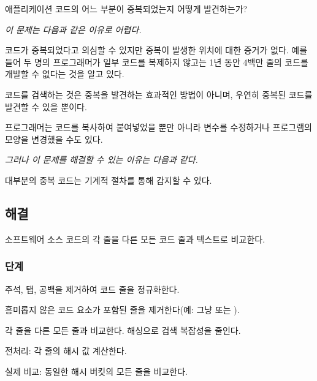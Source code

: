 \documentclass[a4paper,10pt,twoside]{book}
\begin{document}
애플리케이션 코드의 어느 부분이 중복되었는지 어떻게 발견하는가?

\emph{이 문제는 다음과 같은 이유로 어렵다.} 

\begin{bulletlist}
\item 코드가 중복되었다고 의심할 수 있지만 중복이 발생한 위치에 대한 증거가 없다. 예를 들어 두 명의 프로그래머가 일부 코드를 복제하지 않고는 1년 동안 4백만 줄의 코드를 개발할 수 없다는 것을 알고 있다.

\item 코드를 검색하는 것은 중복을 발견하는 효과적인 방법이 아니며, 우연히 중복된 코드를 발견할 수 있을 뿐이다.

\item 프로그래머는 코드를 복사하여 붙여넣었을 뿐만 아니라 변수를 수정하거나 프로그램의 모양을 변경했을 수도 있다.
\end{bulletlist}

\emph{그러나 이 문제를 해결할 수 있는 이유는 다음과 같다.}

\begin{bulletlist}
\item 대부분의 중복 코드는 기계적 절차를 통해 감지할 수 있다.
\end{bulletlist}

\subsection*{해결}

소프트웨어 소스 코드의 각 줄을 다른 모든 코드 줄과 텍스트로 비교한다.

\subsubsection*{단계}

\begin{bulletlist}
\item 주석, 탭, 공백을 제거하여 코드 줄을 정규화한다.

\item 흥미롭지 않은 코드 요소가 포함된 줄을 제거한다(예: 그냥  또는 \lct{\}}).

\item 각 줄을 다른 모든 줄과 비교한다. 해싱으로 검색 복잡성을 줄인다.

\begin{bulletlist}
\item 전처리: 각 줄의 해시 값 계산한다.
\item 실제 비교: 동일한 해시 버킷의 모든 줄을 비교한다.
\end{bulletlist}
\end{bulletlist}
\end{document}

